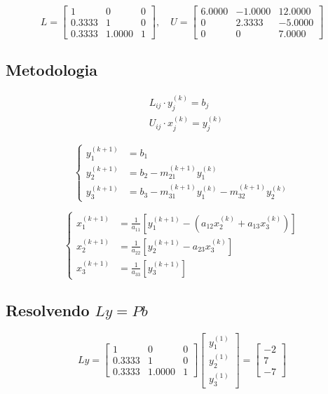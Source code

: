 \documentclass[12pt,a4paper]{article}
\begin{document}
\[
L =
\begin{bmatrix}
1      & 0      & 0 \\
0.3333 & 1      & 0 \\
0.3333 & 1.0000 & 1
\end{bmatrix},
\quad
U =
\begin{bmatrix}
6.0000 & -1.0000 & 12.0000 \\
0      & 2.3333  & -5.0000 \\
0      & 0       & 7.0000
\end{bmatrix}
\]

\subsection{Metodologia}

\begin{align*}
& L_{ij} \cdot y_j^{(k)} = b_j \\
& U_{ij} \cdot x_j^{(k)} = y_j^{(k)}
\end{align*}

\begin{equation*}
\left\{
\begin{aligned}
y_1^{(k+1)} &= b_1 \\
y_2^{(k+1)} &= b_2 - m_{21}^{(k+1)} y_1^{(k)} \\
y_3^{(k+1)} &= b_3 - m_{31}^{(k+1)} y_1^{(k)} - m_{32}^{(k+1)}y_2^{(k)}
\end{aligned}
\right.
\end{equation*}

\vspace{1cm}

\begin{equation*}
\left\{
\begin{aligned}
x_1^{(k+1)} &= \frac{1}{a_{11}}[y_1^{(k+1)} - ( a_{12}x_2^{(k)} + a_{13}x_3^{(k)})] \\
x_2^{(k+1)} &= \frac{1}{a_{22}}[y_2^{(k+1)} - a_{23}x_3^{(k)}]  \\
x_3^{(k+1)} &= \frac{1}{a_{33}}[y_3^{(k+1)}]
\end{aligned}
\right.
\end{equation*}

\subsection{Resolvendo $Ly = Pb$}

\[
Ly =
\begin{bmatrix}
1      & 0      & 0 \\
0.3333 & 1      & 0 \\
0.3333 & 1.0000 & 1
\end{bmatrix}
\begin{bmatrix}
y_1^{(1)} \\
y_2^{(1)} \\
y_3^{(1)}
\end{bmatrix}
=
\begin{bmatrix}
-2 \\
7 \\
-7
\end{bmatrix}
\]
\end{document}
